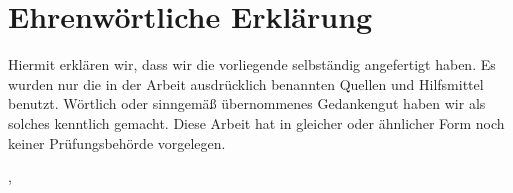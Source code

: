
\section*{Ehrenwörtliche Erklärung}

Hiermit erklären wir, dass wir die vorliegende \dokumententyp{} selbständig angefertigt haben. Es wurden nur die in der Arbeit ausdrücklich benannten Quellen und Hilfsmittel benutzt. Wörtlich oder sinngemäß übernommenes Gedankengut haben wir als solches kenntlich gemacht. Diese Arbeit hat in gleicher oder ähnlicher Form noch keiner Prüfungsbehörde vorgelegen.
\vspace{20mm}

\ort, \abgabedatum
\vspace{10mm}

\underline{\hspace{8cm}}\\
\dokumentenautorA

\vspace{1cm}

\underline{\hspace{8cm}}\\
\dokumentenautorB

\vspace{1cm}

\underline{\hspace{8cm}}\\
\dokumentenautorC
